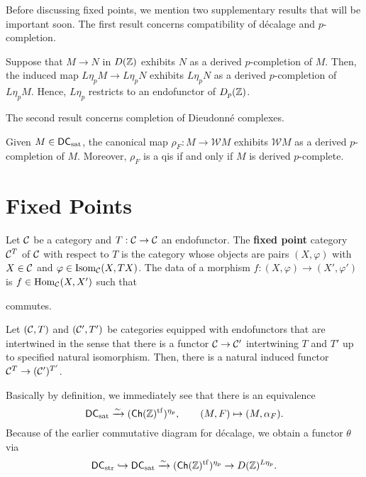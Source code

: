 \documentclass[11pt]{article}
\newcommand{\DC}{\mathsf{DC}} %
\newcommand{\Isom}{\textup{Isom}} %
\newcommand{\sat}{\textup{sat}} %
\newcommand{\str}{\textup{str}} %
\newcommand{\W}{\mathcal{W}}
\renewcommand{\phi}{\varphi}
\begin{document}
Before discussing fixed points, we mention two supplementary results that will be important soon. The first result concerns compatibility of d\'{e}calage and $p$-completion.

\begin{proposition}
Suppose that $M\to N$ in $D(\mathbb{Z})$ exhibits $N$ as a derived $p$-completion of $M$. Then, the induced map $L\eta_pM\to L\eta_pN$ exhibits $L\eta_pN$ as a derived $p$-completion of $L\eta_pM$. Hence, $L\eta_p$ restricts to an endofunctor of $D_p(\mathbb{Z})$.
\end{proposition}

The second result concerns completion of Dieudonn\'{e} complexes. 

\begin{proposition}
Given $M\in\DC_{\sat}$, the canonical map $\rho_F: M\to\W M$ exhibits $\W M$ as a derived $p$-completion of $M$. Moreover, $\rho_F$ is a qis if and only if $M$ is derived $p$-complete.
\end{proposition}

\section{Fixed Points}
\begin{definition}
Let $\mathcal{C}$ be a category and $T: \mathcal{C}\to\mathcal{C}$ an endofunctor. The \textbf{fixed point} category $\mathcal{C}^T$ of $\mathcal{C}$ with respect to $T$ is the category whose objects are pairs $(X,\phi)$ with $X\in\mathcal{C}$ and $\phi\in\Isom_{\mc{C}}(X,TX)$. The data of a morphism $f: (X,\phi)\to(X',\phi')$ is $f\in\operatorname{Hom}_{\mathcal{C}}(X,X')$ such that
\begin{center}
\end{center}
commutes.
\end{definition}

\begin{remark}
Let $(\mathcal{C},T)$ and $(\mathcal{C}',T')$ be categories equipped with endofunctors that are intertwined in the sense that there is a functor $\mathcal{C}\to\mathcal{C}'$ intertwining $T$ and $T'$ up to specified natural isomorphism. Then, there is a natural induced functor $\mathcal{C}^T\to(\mathcal{C}')^{T'}$.
\end{remark}

Basically by definition, we immediately see that there is an equivalence 
$$\DC_{\sat}\xto{\sim}(\Ch(\Z)^{\tf})^{\eta_p},\qquad (M,F)\mapsto(M,\alpha_F).$$ 
Because of the earlier commutative diagram for d\'{e}calage, we obtain a functor $\theta$ via
$$\DC_{\str}\inj\DC_{\sat}\xto{\sim}(\Ch(\Z)^{\tf})^{\eta_p}\to D(\Z)^{L\eta_p}.$$
\end{document}
